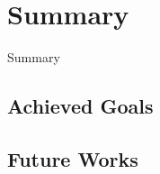 \section{Summary}
\begin{frame}
	\begin{center}
	\huge{Summary}
	\end{center}
\end{frame}

\subsection*{Achieved Goals}


\subsection*{Future Works}



